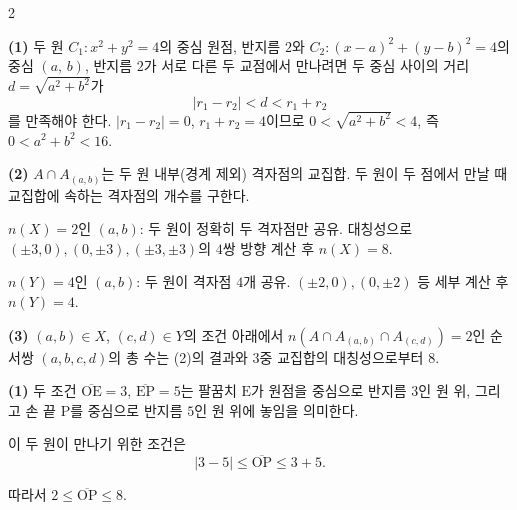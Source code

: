 \documentclass[10pt,fleqn]{article}
\renewcommand{\solpart}[1]{%
  \par\addvspace{10pt}\noindent
  {\sffamily\bfseries\color{black}(#1)}\hspace{3mm}\ignorespaces%
}
\begin{document}
\begin{multicols}{2}
\solpart{1} 두 원 $C_{1}: x^{2}+y^{2}=4$의 중심 원점, 반지름 $2$와 $C_{2}: (x-a)^{2}+(y-b)^{2}=4$의 중심 $(a,\,b)$, 반지름 $2$가 서로 다른 두 교점에서 만나려면 두 중심 사이의 거리 $d = \sqrt{a^{2}+b^{2}}$가
\[ |r_{1}-r_{2}| < d < r_{1}+r_{2} \]
를 만족해야 한다. $|r_{1}-r_{2}|=0$, $r_{1}+r_{2}=4$이므로 $0 < \sqrt{a^{2}+b^{2}} < 4$, 즉 $0 < a^{2}+b^{2} < 16$.

\solpart{2} $A \cap A_{(a,b)}$는 두 원 내부(경계 제외) 격자점의 교집합. 두 원이 두 점에서 만날 때 교집합에 속하는 격자점의 개수를 구한다.

$n(X) = 2$인 $(a, b)$: 두 원이 정확히 두 격자점만 공유. 대칭성으로 $(\pm 3, 0), (0, \pm 3), (\pm 3, \pm 3)$의 $4$쌍 방향 계산 후 $n(X)=8$.

$n(Y) = 4$인 $(a, b)$: 두 원이 격자점 $4$개 공유. $(\pm 2, 0), (0, \pm 2)$ 등 세부 계산 후 $n(Y)=4$.

\solpart{3} $(a, b) \in X$, $(c, d) \in Y$의 조건 아래에서 $n(A \cap A_{(a,b)} \cap A_{(c,d)}) = 2$인 순서쌍 $(a,b,c,d)$의 총 수는 (2)의 결과와 3중 교집합의 대칭성으로부터 $8$.



\solpart{1} 두 조건 $\overline{\mathrm{OE}}=3$, $\overline{\mathrm{EP}}=5$는 팔꿈치 $\mathrm{E}$가 원점을 중심으로 반지름 $3$인 원 위, 그리고 손 끝 $\mathrm{P}$를 중심으로 반지름 $5$인 원 위에 놓임을 의미한다.

이 두 원이 만나기 위한 조건은
\[ |3-5| \le \overline{\mathrm{OP}} \le 3+5. \]

따라서 $2 \le \overline{\mathrm{OP}} \le 8$.


\end{multicols}
\end{document}
